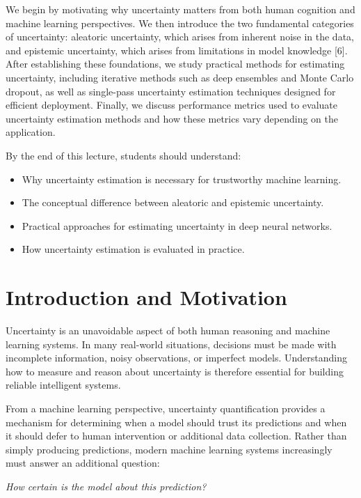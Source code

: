 \documentclass{article}
\renewcommand{\cite}[1]{[#1]}
\begin{document}
We begin by motivating why uncertainty matters from both human cognition and machine learning perspectives. We then introduce the two fundamental categories of uncertainty: aleatoric uncertainty, which arises from inherent noise in the data, and epistemic uncertainty, which arises from limitations in model knowledge \cite{6}. After establishing these foundations, we study practical methods for estimating uncertainty, including iterative methods such as deep ensembles and Monte Carlo dropout, as well as single-pass uncertainty estimation techniques designed for efficient deployment. Finally, we discuss performance metrics used to evaluate uncertainty estimation methods and how these metrics vary depending on the application.

By the end of this lecture, students should understand:
\begin{itemize}
\item Why uncertainty estimation is necessary for trustworthy machine learning.
\item The conceptual difference between aleatoric and epistemic uncertainty.
\item Practical approaches for estimating uncertainty in deep neural networks.
\item How uncertainty estimation is evaluated in practice.
\end{itemize}


\section{Introduction and Motivation}

Uncertainty is an unavoidable aspect of both human reasoning and machine learning systems. In many real-world situations, decisions must be made with incomplete information, noisy observations, or imperfect models. Understanding how to measure and reason about uncertainty is therefore essential for building reliable intelligent systems.

From a machine learning perspective, uncertainty quantification provides a mechanism for determining when a model should trust its predictions and when it should defer to human intervention or additional data collection. Rather than simply producing predictions, modern machine learning systems increasingly must answer an additional question:

\begin{center}
\textit{How certain is the model about this prediction?}
\end{center}
\end{document}
